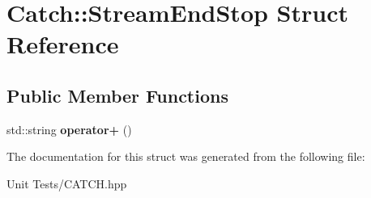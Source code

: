 \hypertarget{structCatch_1_1StreamEndStop}{}\section{Catch\+:\+:Stream\+End\+Stop Struct Reference}
\label{structCatch_1_1StreamEndStop}
\subsection*{Public Member Functions}
\begin{DoxyCompactItemize}
\item 
std\+::string {\bfseries operator+} ()\hypertarget{structCatch_1_1StreamEndStop_a3025092e06c224e0845f2caa07b26d0e}{}\label{structCatch_1_1StreamEndStop_a3025092e06c224e0845f2caa07b26d0e}

\end{DoxyCompactItemize}


The documentation for this struct was generated from the following file\+:\begin{DoxyCompactItemize}
\item 
Unit Tests/C\+A\+T\+C\+H.\+hpp\end{DoxyCompactItemize}
